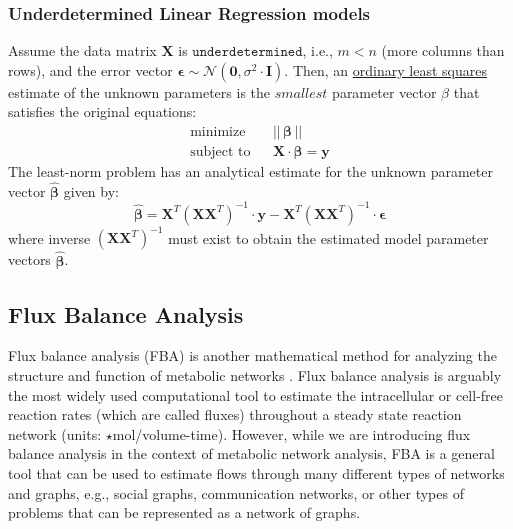 \documentclass{article}[12pt]
\begin{document}
\subsubsection*{Underdetermined Linear Regression models}
Assume the data matrix $\mathbf{X}$ is $\texttt{underdetermined}$, i.e., $m < n$ (more columns than rows), and 
the error vector $\mathbf{\epsilon}\sim\mathcal{N}(\mathbf{0},\sigma^{2}\cdot\mathbf{I})$.
Then, an \href{https://en.wikipedia.org/wiki/Ordinary_least_squares}{ordinary least squares} estimate of the unknown parameters is the $\textit{smallest}$ parameter vector $\beta$ that satisfies the original equations:
\begin{eqnarray*}
\text{minimize}~& & ||\,\mathbf{\beta}\,|| \\
\text{subject to} & & \mathbf{X}\cdot\mathbf{\beta} = \mathbf{y}
\end{eqnarray*}
The least-norm problem has an analytical estimate for the unknown parameter vector $\hat{\mathbf{\beta}}$ given by:
\begin{equation*}
\hat{\mathbf{\beta}} =\mathbf{X}^{T}\left(\mathbf{X}\mathbf{X}^{T}\right)^{-1}\cdot\mathbf{y} - \mathbf{X}^{T}\left(\mathbf{X}\mathbf{X}^{T}\right)^{-1}\cdot\mathbf{\epsilon}
\end{equation*}
where inverse $\left(\mathbf{X}\mathbf{X}^{T}\right)^{-1}$ must exist to obtain the estimated model parameter vectors $\hat{\mathbf{\beta}}$.




\subsection{Flux Balance Analysis}
Flux balance analysis (FBA) is another mathematical method for analyzing the structure and function of metabolic networks \cite{Orth:2010aa}.
Flux balance analysis is arguably the most widely used computational tool to estimate the intracellular or cell-free reaction rates (which are called fluxes) 
throughout a steady state reaction network (units: $\star$mol/volume-time). 
However, while we are introducing flux balance analysis in the context of metabolic network analysis, FBA is a general tool that can be used to 
estimate flows through many different types of networks and graphs, e.g., social graphs, communication networks, or other types of problems that can be represented as a network of graphs.  
\end{document}
